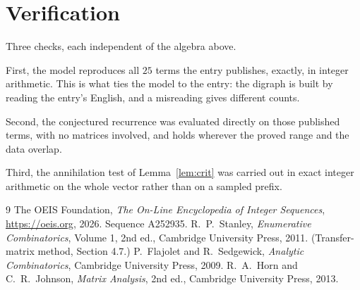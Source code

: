 \documentclass[11pt,a4paper]{article}
\theoremstyle{plain}
\theoremstyle{definition}
\begin{document}
\section{Verification}

Three checks, each independent of the algebra above.

First, the model reproduces all $25$ terms the entry publishes, exactly, in integer
arithmetic. This is what ties the model to the entry: the digraph is built by reading the
entry's English, and a misreading gives different counts.

Second, the conjectured recurrence was evaluated directly on those published terms, with no
matrices involved, and holds wherever the proved range and the data overlap.

Third, the annihilation test of Lemma~\ref{lem:crit} was carried out in exact integer
arithmetic on the whole vector rather than on a sampled prefix.

\begin{thebibliography}{9}
 The OEIS Foundation, \emph{The On-Line Encyclopedia of Integer
Sequences}, \url{https://oeis.org}, 2026. Sequence A252935.
 R.~P.~Stanley, \emph{Enumerative Combinatorics}, Volume 1, 2nd ed.,
Cambridge University Press, 2011. (Transfer-matrix method, Section 4.7.)
 P.~Flajolet and R.~Sedgewick, \emph{Analytic Combinatorics}, Cambridge
University Press, 2009.
 R.~A.~Horn and C.~R.~Johnson, \emph{Matrix Analysis}, 2nd ed., Cambridge
University Press, 2013.
\end{thebibliography}
\end{document}
